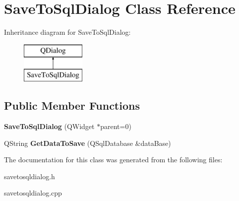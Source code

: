 \hypertarget{class_save_to_sql_dialog}{}\section{Save\+To\+Sql\+Dialog Class Reference}
\label{class_save_to_sql_dialog}
Inheritance diagram for Save\+To\+Sql\+Dialog\+:\begin{figure}[H]
\begin{center}
\leavevmode
\includegraphics[height=2.000000cm]{class_save_to_sql_dialog}
\end{center}
\end{figure}
\subsection*{Public Member Functions}
\begin{DoxyCompactItemize}
\item 
\mbox{\label{class_save_to_sql_dialog_a971f4d294b531372f14501f7b19d7e2e}} 
{\bfseries Save\+To\+Sql\+Dialog} (Q\+Widget $\ast$parent=0)
\item 
\mbox{\label{class_save_to_sql_dialog_ada7a920c7005102fc334d709e1d2c18c}} 
Q\+String {\bfseries Get\+Data\+To\+Save} (Q\+Sql\+Database \&data\+Base)
\end{DoxyCompactItemize}


The documentation for this class was generated from the following files\+:\begin{DoxyCompactItemize}
\item 
savetosqldialog.\+h\item 
savetosqldialog.\+cpp\end{DoxyCompactItemize}
